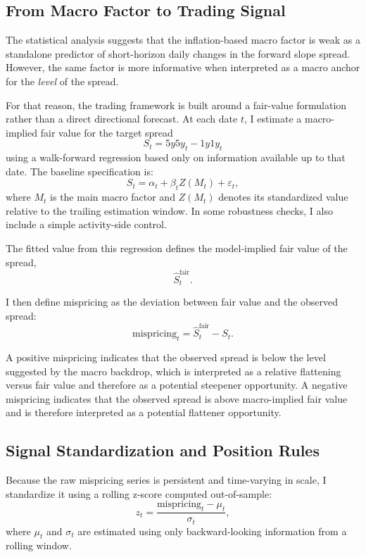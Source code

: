 \documentclass[11pt]{article}
\begin{document}
	\subsection{From Macro Factor to Trading Signal}
	\label{subsec:macro_to_signal}
	
	The statistical analysis suggests that the inflation-based macro factor is weak as a standalone predictor of short-horizon daily changes in the forward slope spread. However, the same factor is more informative when interpreted as a macro anchor for the \emph{level} of the spread.
	
	For that reason, the trading framework is built around a fair-value formulation rather than a direct directional forecast. At each date \(t\), I estimate a macro-implied fair value for the target spread
	\[
	S_t = 5y5y_t - 1y1y_t
	\]
	using a walk-forward regression based only on information available up to that date. The baseline specification is:
	\[
	S_t = \alpha_t + \beta_t Z(M_t) + \varepsilon_t,
	\]
	where \(M_t\) is the main macro factor and \(Z(M_t)\) denotes its standardized value relative to the trailing estimation window. In some robustness checks, I also include a simple activity-side control.
	
	The fitted value from this regression defines the model-implied fair value of the spread,
	\[
	\widehat{S}^{\text{fair}}_t.
	\]
	
	I then define mispricing as the deviation between fair value and the observed spread:
	\[
	\text{mispricing}_t = \widehat{S}^{\text{fair}}_t - S_t.
	\]
	
	A positive mispricing indicates that the observed spread is below the level suggested by the macro backdrop, which is interpreted as a relative flattening versus fair value and therefore as a potential steepener opportunity. A negative mispricing indicates that the observed spread is above macro-implied fair value and is therefore interpreted as a potential flattener opportunity.
	
	\subsection{Signal Standardization and Position Rules}
	\label{subsec:signal_rules}
	
	Because the raw mispricing series is persistent and time-varying in scale, I standardize it using a rolling z-score computed out-of-sample:
	\[
	z_t =
	\frac{\text{mispricing}_t - \mu_t}{\sigma_t},
	\]
	where \(\mu_t\) and \(\sigma_t\) are estimated using only backward-looking information from a rolling window.
	
\end{document}
